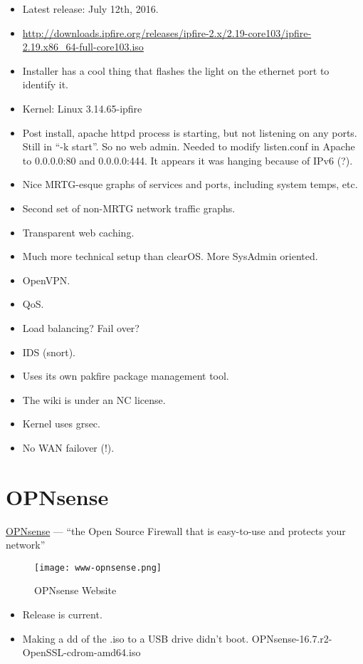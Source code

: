 \begin{itemize}
 \item Latest release: July 12th, 2016.
 \item \url{http://downloads.ipfire.org/releases/ipfire-2.x/2.19-core103/ipfire-2.19.x86_64-full-core103.iso}
 \item Installer has a cool thing that flashes the light on the ethernet port to identify it.
 \item Kernel: Linux 3.14.65-ipfire
 \item Post install, apache httpd process is starting, but not listening on any ports. Still in ``-k start''. So no web admin. Needed to modify listen.conf in Apache to 0.0.0.0:80 and 0.0.0.0:444. It appears it was hanging because of IPv6 (?).
 \item Nice MRTG-esque graphs of services and ports, including system temps, etc.
 \item Second set of non-MRTG network traffic graphs.
 \item Transparent web caching.
 \item Much more technical setup than clearOS. More SysAdmin oriented.
 \item OpenVPN.
 \item QoS.
 \item Load balancing? Fail over?
 \item IDS (snort).
 \item Uses its own pakfire package management tool.
 \item The wiki is under an NC license.
 \item Kernel uses grsec.
 \item No WAN failover (!).
\end{itemize}


\section{OPNsense}
 \href{https://opnsense.org/}{OPNsense} --- ``the Open Source Firewall that is easy-to-use and protects your network''

\begin{figure}[h!]
\texttt{[image: www-opnsense.png]}
 \caption{OPNsense Website}
 \label{fig:www-opnsense}
\end{figure}

\begin{itemize}
 \item Release is current.
 \item Making a dd of the .iso to a USB drive didn't boot. OPNsense-16.7.r2-OpenSSL-cdrom-amd64.iso
\end{itemize}

